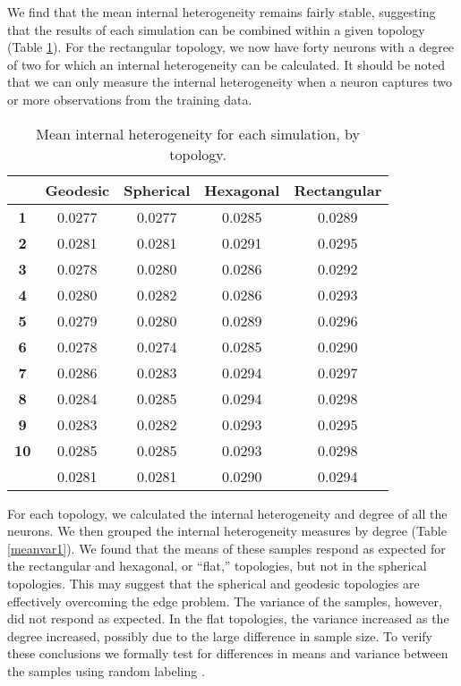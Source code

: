  We find that the
mean internal heterogeneity remains fairly stable, suggesting that the results
of each simulation can be combined within a given topology (Table
\ref{ivtable3}).  For the rectangular
topology, we now have forty neurons with a degree of two for which an internal
heterogeneity can be calculated. It should be noted that we can only measure the
internal heterogeneity when a neuron captures two or more observations from the
training data.

\begin{table}[hbt]
\centering
\caption{Mean internal heterogeneity for each simulation, by topology.}
\label{ivtable3}
\begin{tabular}{|c||c|c|c|c|}
\hline
\textbf{} & Geodesic & Spherical & Hexagonal & Rectangular \\
\hline
\hline
\textbf{1} & 0.0277 & 0.0277 & 0.0285 & 0.0289 \\
\textbf{2} & 0.0281 & 0.0281 & 0.0291 & 0.0295 \\
\textbf{3} & 0.0278 & 0.0280 & 0.0286 & 0.0292 \\
\textbf{4} & 0.0280 & 0.0282 & 0.0286 & 0.0293 \\
\textbf{5} & 0.0279 & 0.0280 & 0.0289 & 0.0296 \\
\textbf{6} & 0.0278 & 0.0274 & 0.0285 & 0.0290 \\
\textbf{7} & 0.0286 & 0.0283 & 0.0294 & 0.0297 \\
\textbf{8} & 0.0284 & 0.0285 & 0.0294 & 0.0298 \\
\textbf{9} & 0.0283 & 0.0282 & 0.0293 & 0.0295 \\
\textbf{10}& 0.0285 & 0.0285 & 0.0293 & 0.0298 \\
\hline
\hline
& 0.0281 & 0.0281 & 0.0290 & 0.0294\\
\hline
\end{tabular} \end{table}

For each topology, we calculated the internal heterogeneity and degree of all
the neurons.  We then grouped the internal heterogeneity measures by degree
(Table \ref{meanvar1}).  We
found that the means of these samples respond as expected for the rectangular
and hexagonal, or ``flat,''  topologies, but not in the spherical topologies.
This may suggest that the spherical and geodesic topologies are effectively
overcoming the edge problem.  The variance of the samples, however, did not
respond as expected.  In the flat topologies, the variance increased as the
degree increased, possibly due to the large difference in sample size.  To
verify these conclusions we formally test for differences in means and variance
between the samples using random labeling \cite{siss2004}.


